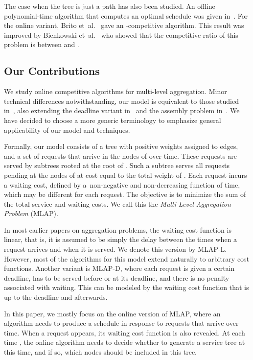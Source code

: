 \documentclass[a4paper]{article}
\newcommand{\etal}{et~al.}
\newcommand{\MLAP}{\mbox{\rm\textsf{MLAP}}}
\newcommand{\MLAPL}{\mbox\rm{\textsf{MLAP-L}}}
\newcommand{\MLAPD}{\mbox{\rm\textsf{MLAP-D}}}
\begin{document}
The case when the tree is just a path has also been studied.
An offline polynomial-time algorithm that computes an optimal schedule was given in~\cite{aggregation_wads_2013}.
For the online variant,
Brito {\etal}~\cite{aggregation-bkv} gave an -competitive algorithm.
This result was improved by Bienkowski {\etal}~\cite{aggregation_wads_2013} who showed that
the competitive ratio of this problem is between  and .


\subsection{Our Contributions}

We study online competitive algorithms for multi-level aggregation. Minor technical
differences notwithstanding, our model is equivalent to those studied
in~\cite{aggregation-bkv,khanna-message-aggregation}, also extending the
deadline variant in~\cite{packet-aggregation-becchetti} and the assembly
problem in~\cite{jrp-levi-2-approx}. We have decided to choose a more generic
terminology to emphasize general applicability of our model and techniques.

Formally, our model consists of a tree  with positive weights assigned to edges,
and a set  of requests that arrive in the nodes of  over time. These
requests are served by subtrees rooted at the root of . Such a
subtree  serves all requests pending at the nodes of  at cost equal to
the total weight of . Each request incurs a waiting cost, defined by 
a~non-negative and non-decreasing function of time, which may be different for
each request. The objective is to minimize the sum of the total
service and waiting costs. We call this the \emph{Multi-Level Aggregation
Problem} ({\MLAP}).

In most earlier papers on aggregation problems, the waiting cost function is
linear, that is, it is
assumed to be simply the delay between the times when a request arrives and
when it is served. We denote this version by  {\MLAPL}.
However, most of the algorithms for this model extend naturally to arbitrary cost
functions.
Another variant is  {\MLAPD}, where each request is given a certain deadline,
has to be served before or at its deadline, and there is no penalty associated
with waiting. This can be modeled by the waiting cost function that is  up to
the deadline and  afterwards.

In this paper, we mostly focus on the online version of {\MLAP}, where an algorithm needs to
produce a schedule in response to requests that arrive over time.
When a request appears, its waiting cost function is
also revealed. At each time , the online algorithm needs to decide whether to
generate a service tree at this time, and if so, which nodes should be included in this tree.
\end{document}
